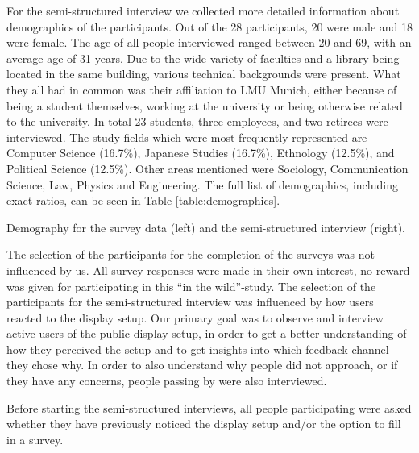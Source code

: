 		For the semi-structured interview we collected more detailed information about demographics of the participants. Out of the 28 participants,
		20 were male and 18 were female. The age of all people interviewed ranged between 20 and 69, with an average age of 31 years.	Due to the wide variety of faculties and a library being located in the same building, various technical backgrounds were present. What they all had in common was their affiliation to LMU Munich, either because of being a student themselves, working at the university or being otherwise related to the university. In total 23 students, three employees, and two retirees were interviewed. The study fields which were most frequently represented are Computer Science (16.7\%), Japanese Studies (16.7\%), Ethnology (12.5\%), and Political Science (12.5\%). Other areas mentioned were Sociology, Communication Science, Law, Physics and Engineering. The full list of demographics, including exact ratios, can be seen in Table \ref{table:demographics}.


		\begin{table}[h]

			

			\caption[Demographics of Field Study]{Demography for the survey data (left) and the semi-structured interview (right).}
			\label{table:demographics}
		\end{table}


		The selection of the participants for the completion of the surveys was not influenced by us. All survey responses were made in their own interest, no reward was given for participating in this ``in the wild''-study.
		The selection of the participants for the semi-structured interview was influenced by how users reacted to the display setup. Our primary goal was to observe and interview active users of the public display setup, in order to get a better understanding of how they perceived the setup and to get insights into which feedback channel they chose why. In order to also understand why people did not approach, or if they have any concerns, people passing by were also interviewed. 

		
		Before starting the semi-structured interviews, all people participating were asked whether they have previously noticed the display setup and/or the option to fill in a survey. 

